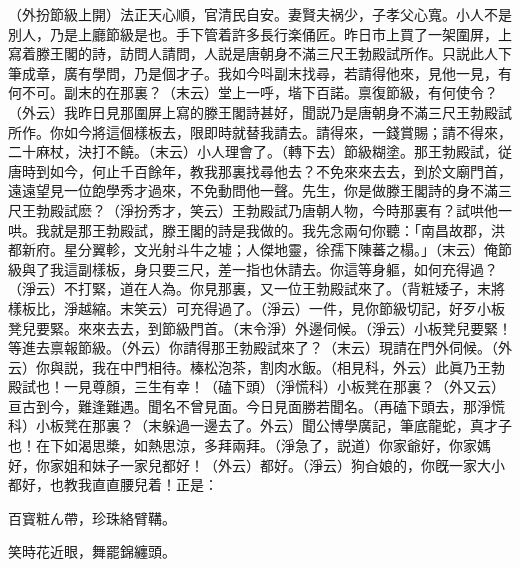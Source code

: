 （外扮節級上開）法正天心順，官清民自安。妻賢夫祸少，子孝父心寬。小人不是別人，乃是上廳節級是也。手下管着許多長行楽俑匠。昨日市上買了一架圍屏，上寫着滕王閣的詩，訪問人請問，人説是唐朝身不滿三尺王勃殿試所作。只説此人下筆成章，廣有學問，乃是個才子。我如今呌副末找尋，若請得他來，見他一見，有何不可。副末的在那裏？（末云）堂上一呼，堦下百諾。禀復節級，有何使令？（外云）我昨日見那圍屏上寫的滕王閣詩甚好，聞説乃是唐朝身不滿三尺王勃殿試所作。你如今將這個樣板去，限即時就替我請去。請得來，一錢賞賜；請不得來，二十麻杖，決打不饒。（末云）小人理會了。（轉下去）節級糊塗。那王勃殿試，従唐時到如今，何止千百餘年，教我那裏找尋他去？不免來來去去，到於文廟門首，遠遠望見一位飽學秀才過來，不免動問他一聲。先生，你是做滕王閣詩的身不滿三尺王勃殿試麽？（淨扮秀才，笑云）王勃殿試乃唐朝人物，今時那裏有？試哄他一哄。我就是那王勃殿試，滕王閣的詩是我做的。我先念兩句你聽：「南昌故郡，洪都新府。星分翼軫，文光射斗牛之墟；人傑地靈，徐孺下陳蕃之榻。」（末云）俺節級與了我這副樣板，身只要三尺，差一指也休請去。你這等身軀，如何充得過？（淨云）不打緊，道在人為。你見那裏，又一位王勃殿試來了。（背粧矮子，末將樣板比，淨越縮。末笑云）可充得過了。（淨云）一件，見你節級切記，好歹小板凳兒要緊。來來去去，到節級門首。（末令淨）外邊伺候。（淨云）小板凳兒要緊！等進去禀報節級。（外云）你請得那王勃殿試來了？（末云）現請在門外伺候。（外云）你與説，我在中門相待。榛松泡茶，割肉水飯。（相見科，外云）此眞乃王勃殿試也！一見尊顏，三生有幸！（磕下頭）（淨慌科）小板凳在那裏？（外又云）亘古到今，難逢難遇。聞名不曾見面。今日見面勝若聞名。（再磕下頭去，那淨慌科）小板凳在那裏？（末躲過一邊去了。外云）聞公博學廣記，筆底龍蛇，真才子也！在下如渴思槳，如熱思涼，多拜兩拜。（淨急了，説道）你家爺好，你家媽好，你家姐和妹子一家兒都好！（外云）都好。（淨云）狗㒲娘的，你旣一家大小都好，也教我直直腰兒着！正是：

百寳粧ん帶，珍珠絡臂鞲。

笑時花近眼，舞罷錦纏頭。

